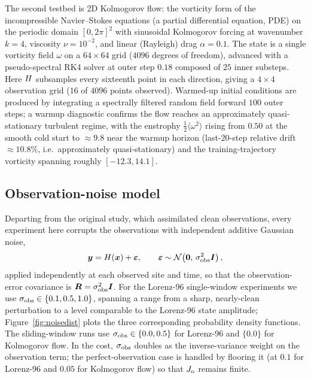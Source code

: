 The second testbed is 2D Kolmogorov flow: the vorticity form
of the incompressible Navier--Stokes equations (a partial differential
equation, PDE) on the periodic domain $[0,2\pi]^2$ with sinusoidal Kolmogorov
forcing at wavenumber $k=4$, viscosity $\nu=10^{-2}$, and linear (Rayleigh)
drag $\alpha=0.1$.
The state is a single vorticity field $\omega$ on a $64\times 64$ grid
($4096$ degrees of freedom), advanced with a pseudo-spectral RK4 solver at outer
step $0.18$ composed of $25$ inner substeps. Here $H$ subsamples every
sixteenth point in each direction, giving a $4\times 4$ observation grid
($16$ of $4096$ points observed). Warmed-up initial conditions are produced by
integrating a spectrally filtered random field forward $100$ outer steps; a
warmup diagnostic confirms the flow reaches an approximately quasi-stationary
turbulent regime, with the enstrophy $\tfrac12\langle\omega^2\rangle$ rising
from $0.50$ at the smooth cold start to $\approx 9.8$ near the warmup horizon
(last-$20$-step relative drift $\approx 10.8\%$, i.e.\ approximately
quasi-stationary) and the training-trajectory vorticity spanning roughly
$[-12.3,14.1]$.

\subsection{Observation-noise model}

Departing from the original study, which assimilated clean observations, every
experiment here corrupts the observations with independent additive Gaussian
noise,
\begin{equation}
\bm{y} = H(\bm{x}) + \boldsymbol\varepsilon,
\qquad
\boldsymbol\varepsilon \sim \mathcal{N}\!\left(\bm{0},\,\sigma_{\mathrm{obs}}^2\bm{I}\right),
\label{eq:noise}
\end{equation}
applied independently at each observed site and time, so that the
observation-error covariance is $\bm{R} = \sigma_{\mathrm{obs}}^2\bm{I}$. For the Lorenz-96
single-window experiments we use $\sigma_{\mathrm{obs}} \in \{0.1, 0.5, 1.0\}$, spanning a
range from a sharp, nearly-clean perturbation to a level comparable to the
Lorenz-96 state amplitude; Figure~\ref{fig:noisedist} plots the three
corresponding probability density functions. The sliding-window runs use
$\sigma_{\mathrm{obs}} \in \{0.0, 0.5\}$ for Lorenz-96 and $\{0.0\}$ for Kolmogorov flow. In
the cost, $\sigma_{\mathrm{obs}}$ doubles as the inverse-variance weight on the observation
term; the perfect-observation case is handled by flooring it (at $0.1$ for
Lorenz-96 and $0.05$ for Kolmogorov flow) so that $J_{\mathrm{o}}$ remains finite.

